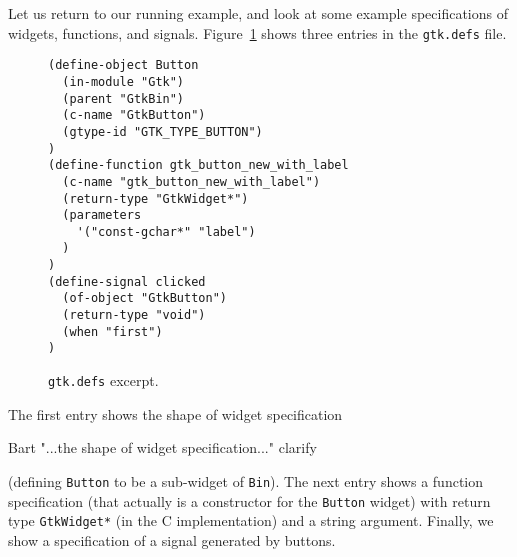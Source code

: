 \documentclass[workingdraft]{usetex-v1}
\begin{document}
Let us return to our running example, and look at some example
specifications of widgets, functions, and signals. Figure~\ref{fig:gtk-defs}
shows three entries in the \texttt{gtk.defs} file.
\begin{figure}[htbp]
\begin{centering}
\begin{verbatim}
(define-object Button
  (in-module "Gtk")
  (parent "GtkBin")
  (c-name "GtkButton")
  (gtype-id "GTK_TYPE_BUTTON")
)
(define-function gtk_button_new_with_label
  (c-name "gtk_button_new_with_label")
  (return-type "GtkWidget*")
  (parameters
    '("const-gchar*" "label")
  )
)
(define-signal clicked
  (of-object "GtkButton")
  (return-type "void")
  (when "first")
)
\end{verbatim}
\caption{\texttt{gtk.defs} excerpt.\label{fig:gtk-defs}}
\end{centering}
\end{figure}
The first entry shows the shape of widget specification 
\begin{ednote}{Bart}
  "...the shape of widget specification..." clarify
\end{ednote}
(defining \texttt{Button} to be a sub-widget of \texttt{Bin}). The
next entry shows a function specification (that actually is a
constructor for the \texttt{Button} widget) with return type
\texttt{GtkWidget*} (in the C implementation) and a string argument.
Finally, we show a specification of a signal generated by buttons.








\end{document}
